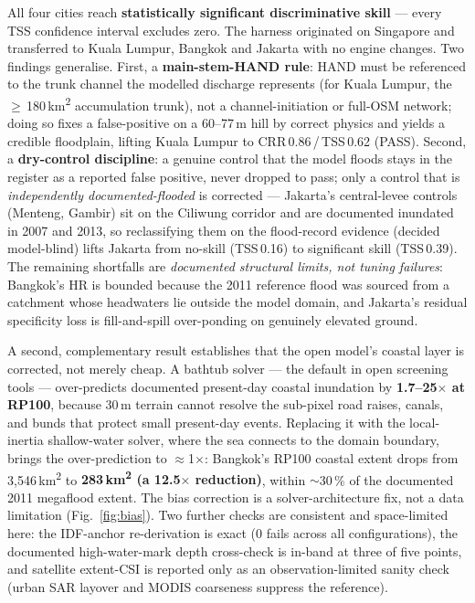 \documentclass[conference]{IEEEtran}
\begin{document}
All four cities reach \textbf{statistically significant discriminative skill} ---
every TSS confidence interval excludes zero. The harness originated on Singapore and
transferred to Kuala Lumpur, Bangkok and Jakarta with no engine changes. Two findings
generalise. First, a \textbf{main-stem-HAND rule}: HAND must be referenced to the
trunk channel the modelled discharge represents (for Kuala Lumpur, the
$\geq$\,180\,km\textsuperscript{2} accumulation trunk), not a channel-initiation or
full-OSM network; doing so fixes a false-positive on a 60--77\,m hill by correct
physics and yields a credible floodplain, lifting Kuala Lumpur to CRR\,0.86\,/\,TSS\,0.62
(PASS). Second, a \textbf{dry-control discipline}: a genuine control that the model
floods stays in the register as a reported false positive, never dropped to pass; only
a control that is \emph{independently documented-flooded} is corrected --- Jakarta's
central-levee controls (Menteng, Gambir) sit on the Ciliwung corridor and are
documented inundated in 2007 and 2013, so reclassifying them on the flood-record
evidence (decided model-blind) lifts Jakarta from no-skill (TSS\,0.16) to significant
skill (TSS\,0.39). The remaining shortfalls are \emph{documented structural limits,
not tuning failures}: Bangkok's HR is bounded because the 2011 reference flood was
sourced from a catchment whose headwaters lie outside the model domain, and Jakarta's
residual specificity loss is fill-and-spill over-ponding on genuinely elevated ground.

A second, complementary result establishes that the open model's coastal layer is
corrected, not merely cheap. A bathtub solver --- the default in open screening tools
--- over-predicts documented present-day coastal inundation by \textbf{1.7--25$\times$
at RP100}, because 30\,m terrain cannot resolve the sub-pixel road raises, canals, and
bunds that protect small present-day events. Replacing it with the local-inertia
shallow-water solver, where the sea connects to the domain boundary, brings the
over-prediction to $\approx$1$\times$: Bangkok's RP100 coastal extent drops from
3{,}546\,km\textsuperscript{2} to \textbf{283\,km\textsuperscript{2} (a 12.5$\times$
reduction)}, within $\sim$30\,\% of the documented 2011 megaflood extent. The bias
correction is a solver-architecture fix, not a data limitation
(Fig.~\ref{fig:bias}). Two further checks are consistent and space-limited here: the
IDF-anchor re-derivation is exact (0 fails across all configurations), the documented
high-water-mark depth cross-check is in-band at three of five points, and satellite
extent-CSI is reported only as an observation-limited sanity check (urban SAR layover
and MODIS coarseness suppress the reference).
\end{document}
